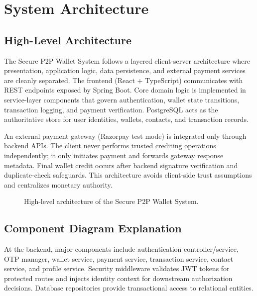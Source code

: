 \documentclass[conference]{IEEEtran}
\begin{document}
\section{System Architecture}
\subsection{High-Level Architecture}
The Secure P2P Wallet System follows a layered client-server architecture where presentation, application logic, data persistence, and external payment services are cleanly separated. The frontend (React + TypeScript) communicates with REST endpoints exposed by Spring Boot. Core domain logic is implemented in service-layer components that govern authentication, wallet state transitions, transaction logging, and payment verification. PostgreSQL acts as the authoritative store for user identities, wallets, contacts, and transaction records.

An external payment gateway (Razorpay test mode) is integrated only through backend APIs. The client never performs trusted crediting operations independently; it only initiates payment and forwards gateway response metadata. Final wallet credit occurs after backend signature verification and duplicate-check safeguards. This architecture avoids client-side trust assumptions and centralizes monetary authority.

\begin{figure}[t]
\centering
{}
\caption{High-level architecture of the Secure P2P Wallet System.}
\label{fig:high_level_arch}
\end{figure}

\subsection{Component Diagram Explanation}
At the backend, major components include authentication controller/service, OTP manager, wallet service, payment service, transaction service, contact service, and profile service. Security middleware validates JWT tokens for protected routes and injects identity context for downstream authorization decisions. Database repositories provide transactional access to relational entities.
\end{document}
